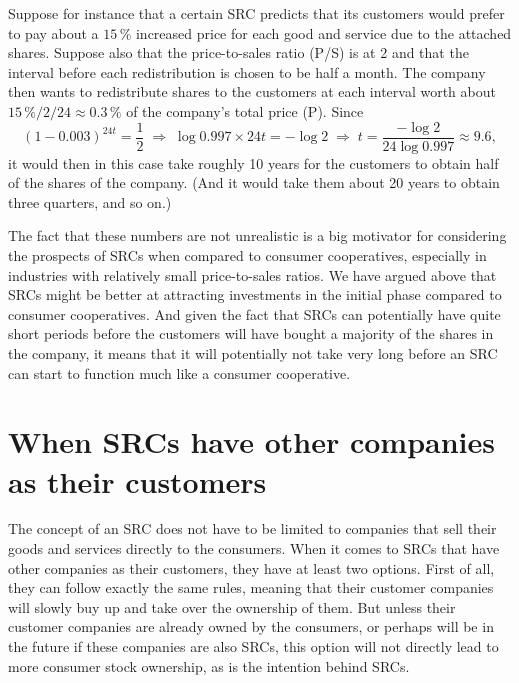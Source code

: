 \documentclass{article}
\begin{document}
Suppose for instance that a certain SRC predicts that its customers would prefer to pay about a $15\, \%$ increased price for each good and service due to the attached shares. Suppose also that the price-to-sales ratio (P/S) is at 2 and that the interval before each redistribution is chosen to be half a month. The company then wants to redistribute shares to the customers at each interval worth about $15\, \% / 2 / 24 \approx 0.3\, \%$ of the company's total price (P).
Since
\[
	(1 - 0.003)^{24 t} = \frac{1}{2} 
	\;\Rightarrow\; 
	\log 0.997 \times 24 t = -\log 2 
	\;\Rightarrow\; 
	t = \frac{-\log 2}{24 \log 0.997} \approx 9.6,
\]
it would then in this case take roughly 10 years for the customers to obtain half of the shares of the company. (And it would take them about 20 years to obtain three quarters, and so on.)

The fact that these numbers are not unrealistic is a big motivator for considering the prospects of SRCs when compared to consumer cooperatives, especially in industries with relatively small price-to-sales ratios. We have argued above that SRCs might be better at attracting investments in the initial phase compared to consumer cooperatives. And given the fact that SRCs can potentially have quite short periods before the customers will have bought a majority of the shares in the company, it means that it will potentially not take very long before an SRC can start to function much like a consumer cooperative. 




\section{When SRCs have other companies as their customers}
\label{sect_B2B}

The concept of an SRC does not have to be limited to companies that sell their goods and services directly to the consumers. When it comes to SRCs that have other companies as their customers, they have at least two options. First of all, they can follow exactly the same rules, meaning that their customer companies will slowly buy up and take over the ownership of them. But unless their customer companies are already owned by the consumers, or perhaps will be in the future if these companies are also SRCs, this option will not directly lead to more consumer stock ownership, as is the intention behind SRCs. 
\end{document}
